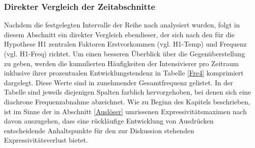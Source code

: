 \subsubsection{Direkter Vergleich der Zeitabschnitte}
Nachdem die festgelegten Intervalle der Reihe nach analysiert wurden, folgt in diesem Abschnitt ein direkter Vergleich ebendieser, der sich nach den für die Hypothese H1 zentralen Faktoren Erstvorkommen (vgl. H1-Temp) und Frequenz (vgl. H1-Freq) richtet. Um einen besseren Überblick über die Gegenüberstellung zu geben, werden die kumulierten Häufigkeiten der Intensivierer pro Zeitraum inklusive ihrer prozentualen Entwicklungstendenz in Tabelle \ref{Fre4} komprimiert dargelegt. Diese  Werte sind in zunehmender Gesamtfrequenz gelistet. In der Tabelle sind jeweils diejenigen Spalten farblich hervorgehoben, bei denen sich eine diachrone Frequenzabnahme abzeichnet. Wie zu Beginn des Kapitels beschrieben, ist im Sinne der in Abschnitt \ref{Auslöser} umrissenen Expressivitätsmaximen nach \citet[]{Kirschbaum.2002b} davon auszugehen, dass eine rückläufige Entwicklung von Ausdrücken entscheidende Anhaltspunkte für den zur Diskussion stehenden Expressivitätsverlust bietet.

